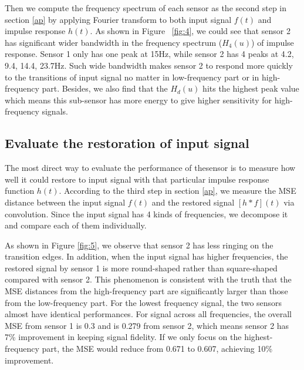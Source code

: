 \documentclass[12pt,a4paper,twocolumn]{article}
\begin{document}
Then we compute the frequency spectrum of each sensor as the second step in section \ref{ap} by applying Fourier transform to both input signal $f(t)$ and impulse response $h(t)$. As shown in Figure ~\ref{fig:4}, we could see that sensor 2 has significant wider bandwidth in the frequency spectrum ($H_4(u)$) of impulse response. Sensor 1 only has one peak at 15Hz, while sensor 2 has 4 peaks at 4.2, 9.4, 14.4, 23.7Hz. Such wide bandwidth makes sensor 2 to respond more quickly to the transitions of input signal no matter in low-frequency part or in high-frequency part. Besides, we also find that the $H_d(u)$ hits the highest peak value which means this sub-sensor has more energy to give higher sensitivity for high-frequency signals.

\subsection{Evaluate the restoration of input signal}
The most direct way to evaluate the performance of thesensor is to measure how well it could restore to input signal with that particular impulse response function $h(t)$. According to the third step in section \ref{ap}, we measure the MSE distance between the input signal $f(t)$ and the restored signal $[h*f](t)$ via convolution. Since the input signal has 4 kinds of frequencies, we decompose it and compare each of them individually. 

As shown in Figure \ref{fig:5}, we observe that sensor 2 has less ringing on the transition edges. In addition, when the input signal has higher frequencies, the restored signal by sensor 1 is more round-shaped rather than square-shaped compared with sensor 2. This phenomenon is consistent with the truth that the MSE distances from the high-frequency part are significantly larger than those from the low-frequency part. For the lowest frequency signal, the two sensors almost have identical performances. For signal across all frequencies, the overall MSE from sensor 1 is 0.3 and is 0.279 from sensor 2, which means sensor 2 has 7\% improvement in keeping signal fidelity. If we only focus on the highest-frequency part, the MSE would reduce from 0.671 to 0.607, achieving 10\% improvement.
\end{document}

